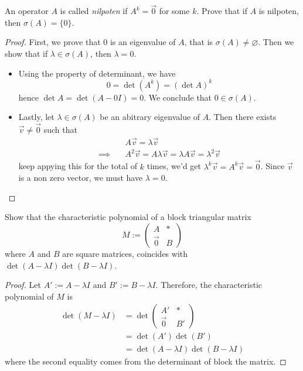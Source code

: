 \begin{exercise}
  An operator $A$ is called \emph{nilpoten} if $A^k=\vec{0}$ for 
  some $k$. Prove that if $A$ is nilpoten, then 
  $\sigma(A)=\{0\}$.
\end{exercise}
\begin{proof}
  First, we prove that $0$ is an eigenvalue of $A$, that is 
  $\sigma(A)\neq\varnothing$. Then we show that if 
  $\lambda\in\sigma(A)$, then $\lambda=0$.
  \begin{itemize}
    \item Using the property of determinant, we have
      \[0=\det(A^k)=(\det A)^k\]
      hence $\det A=\det(A-0I)=0$. We conclude that 
      $0\in\sigma(A)$.
    \item Lastly, let $\lambda\in\sigma(A)$ be an abitrary eigenvalue
      of $A$. Then there exists $\vec{v}\neq\vec{0}$ such that
      \begin{align*}
        &A\vec{v}=\lambda\vec{v}\\\implies\quad
        &A^2\vec{v}=A\lambda\vec{v}=\lambda A\vec{v}=\lambda^2\vec{v}
      \end{align*}
      keep appying this for the total of $k$ times, we'd get
      $\lambda^k\vec{v}=A^k\vec{v}=\vec{0}$. Since $\vec{v}$ is a non
      zero vector, we must have $\lambda=0$.
  \end{itemize}
\end{proof}
\begin{exercise}
  Show that the characteristic polynomial of a block triangular
  matrix \[M:=\begin{pmatrix} A&*\\ \vec{0}&B \end{pmatrix}\]
  where $A$ and $B$ are square matrices, coincides with 
  $\det(A-\lambda I)\det(B-\lambda I)$.
\end{exercise}
\begin{proof}
  Let $A':=A-\lambda I$ and $B':=B-\lambda I$. Therefore, the 
  characteristic polynomial of $M$ is
  \begin{align*}
    \det(M-\lambda I)
    &=\det \begin{pmatrix} A'&*\\\vec{0}&B' \end{pmatrix}\\
    &=\det(A')\det(B')\\
    &=\det(A-\lambda I)\det(B-\lambda I)
  \end{align*}
  where the second equality comes from the determinant of block 
  the matrix.
\end{proof}
